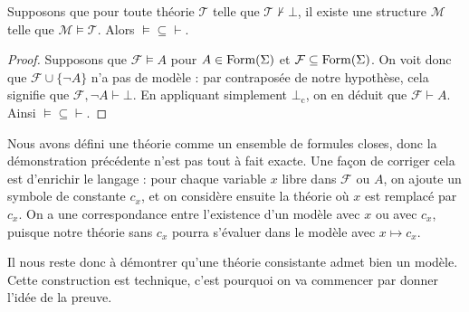 \begin{lemma}
  Supposons que pour toute théorie $\mathcal T$ telle que
  $\mathcal T\not\vdash\bot$, il existe une structure $\mathcal M$ telle que
  $\mathcal M\models \mathcal T$. Alors $\vDash\subseteq\vdash$.
\end{lemma}

\begin{proof}
  Supposons que $\mathcal F\vDash A$ pour $A\in\operatorname{Form}(\Sigma)$ et
  $\mathcal F\subseteq\operatorname{Form}(\Sigma)$. On voit donc que
  $\mathcal F\cup\{\lnot A\}$ n'a pas de modèle : par contraposée de notre
  hypothèse, cela signifie que $\mathcal F,\lnot A\vdash \bot$. En appliquant
  simplement $\bot_\mathrm c$, on en déduit que $\mathcal F\vdash A$. Ainsi
  $\vDash\subseteq\vdash$.
\end{proof}

\begin{remark}
  Nous avons défini une théorie comme un ensemble de formules closes, donc la
  démonstration précédente n'est pas tout à fait exacte. Une façon de corriger
  cela est d'enrichir le langage : pour chaque variable $x$ libre dans
  $\mathcal F$ ou $A$, on ajoute un symbole de constante $c_x$, et on considère
  ensuite la théorie où $x$ est remplacé par $c_x$. On a une correspondance
  entre l'existence d'un modèle avec $x$ ou avec $c_x$, puisque notre théorie
  sans $c_x$ pourra s'évaluer dans le modèle avec $x\mapsto c_x$.
\end{remark}

Il nous reste donc à démontrer qu'une théorie consistante admet bien un modèle.
Cette construction est technique, c'est pourquoi on va commencer par donner
l'idée de la preuve.


